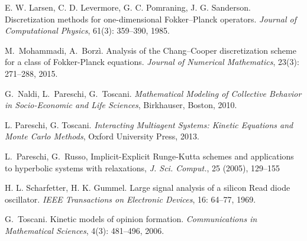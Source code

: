 \documentclass[a4paper]{article}
\theoremstyle{remark}\newtheorem{remark}{Remark}
\begin{document}
\begin{thebibliography}{99}
E. W. Larsen, C. D. Levermore, G. C. Pomraning, J. G. Sanderson. Discretization methods for one-dimensional Fokker--Planck operators. \emph{Journal of Computational Physics}, 61(3): 359--390, 1985.

M.~Mohammadi, A.~Borz\`i. Analysis of the Chang--Cooper discretization scheme for a class of Fokker-Planck equations. \emph{Journal of Numerical Mathematics}, 23(3): 271--288, 2015.

 G.~Naldi, L.~Pareschi, G.~Toscani. \emph{Mathematical Modeling of Collective Behavior in Socio-Economic and Life Sciences}, Birkhauser, Boston, 2010.

L. Pareschi, G. Toscani. \emph{Interacting Multiagent Systems: Kinetic Equations and Monte Carlo Methods}, Oxford University Press, 2013.  

 {L.~Pareschi, G.~Russo}, {Implicit-Explicit Runge-Kutta schemes and applications to hyperbolic systems with relaxations}, \emph{J. Sci. Comput.}, 25 (2005), 129--155

H. L. Scharfetter, H. K. Gummel. Large signal analysis of a silicon Read diode oscillator. \emph{IEEE Transactions on Electronic Devices}, 16: 64--77, 1969.

 G.~Toscani. Kinetic models of opinion formation. \emph{Communications in Mathematical Sciences}, 4(3): 481--496, 2006.

\end{thebibliography}
\end{document}
